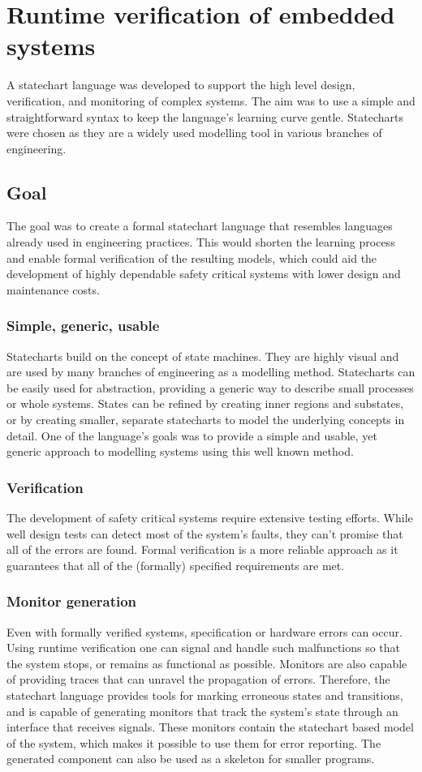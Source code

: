 
\chapter{Runtime verification of embedded systems}
\label{chap:runtime_verification}
A statechart language was developed to support the high level design, verification, and monitoring of complex systems. The aim was to use a simple and straightforward syntax to keep the language’s learning curve gentle. Statecharts were chosen as they are a widely used modelling tool in various branches of engineering.
\section{Goal}
The goal was to create a formal statechart language that resembles languages already used in engineering practices. This would shorten the learning process and enable formal verification of the resulting models, which could aid the development of highly dependable safety critical systems with lower design and maintenance costs.
  \subsection{Simple, generic, usable}
Statecharts build on the concept of state machines. They are highly visual and are used by many branches of engineering as a modelling method. Statecharts can be easily used for abstraction, providing a generic way to describe small processes or whole systems. States can be refined by creating inner regions and substates, or by creating smaller, separate statecharts to model the underlying concepts in detail. One of the language's goals was to provide a simple and usable, yet generic approach to modelling systems using this well known method.
  \subsection{Verification}
The development of safety critical systems require extensive testing efforts. While well design tests can detect most of the system's faults, they can't promise that all of the errors are found. Formal verification is a more reliable approach as it guarantees that all of the (formally) specified requirements are met.
  \subsection{Monitor generation}
Even with formally verified systems, specification or hardware errors can occur. Using runtime verification one can signal and handle such malfunctions so that the system stops, or remains as functional as possible. Monitors are also capable of providing traces that can unravel the propagation of errors. Therefore, the statechart language provides tools for marking erroneous states and transitions, and is capable of generating monitors that track the system's state through an interface that receives signals. These monitors contain the statechart based model of the system, which makes it possible to use them for error reporting. The generated component can also be used as a skeleton for smaller programs.
